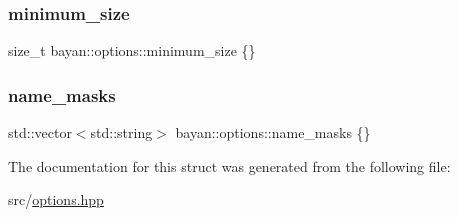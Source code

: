 \subsubsection{\texorpdfstring{minimum\+\_\+size}{minimum\_size}}
{\footnotesize\ttfamily size\+\_\+t bayan\+::options\+::minimum\+\_\+size \{\}}

\mbox{\label{structbayan_1_1options_a9eaad24fb60c372c5f21b06e2d6bd051}} 
\subsubsection{\texorpdfstring{name\+\_\+masks}{name\_masks}}
{\footnotesize\ttfamily std\+::vector$<$std\+::string$>$ bayan\+::options\+::name\+\_\+masks \{\}}



The documentation for this struct was generated from the following file\+:\begin{DoxyCompactItemize}
\item 
src/\hyperlink{options_8hpp}{options.\+hpp}\end{DoxyCompactItemize}
